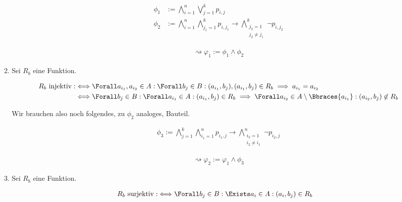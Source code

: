 \begin{solution}
\begin{enumerate}[label = \arabic*.]
  \begin{align*}
    \phi_1
    & :=
    \bigwedge_{i=1}^n \bigvee_{j=1}^kp_{i,j} \\
    \phi_2
    & :=
    \bigwedge_{i=1}^n \bigwedge_{j_1=1}^kp_{i,j_1}
    \to
    \bigwedge_{\substack{j_2=1 \\ j_2\neq j_1}}^{k}\neg p_{i,j_2}
  \end{align*}

  \begin{align*}
    \rightsquigarrow
    \varphi_1 := \phi_1 \land \phi_2
  \end{align*}

  \item Sei $R_b$ eine Funktion.

  \begin{align*}
    R_b ~\text{injektiv}
    :\iff
    & \Forall a_{i_1}, a_{i_2} \in A:
    \Forall b_j \in B:
    (a_{i_1}, b_j), (a_{i_1}, b_j) \in R_b
    \implies
    a_{i_1} = a_{i_2} \\
    \iff
    & \Forall b_j \in B:
    \Forall a_{i_1} \in A:
    (a_{i_1}, b_j) \in R_b
    \implies
    \Forall a_{i_2} \in A \setminus \Bbraces{a_{i_1}}:
    (a_{i_2}, b_j) \not \in R_b
  \end{align*}

  Wir brauchen also noch folgendes, zu $\phi_2$ analoges, Bauteil.

  \begin{align*}
    \phi_3
    :=
    \bigwedge_{j=1}^k \bigwedge_{i_1=1}^np_{i_1,j}
    \to
    \bigwedge_{\substack{i_2=1 \\ i_2\neq i_1}}^{n}\neg p_{i_2,j}
  \end{align*}

  \begin{align*}
    \rightsquigarrow
    \varphi_2
    :=
    \varphi_1 \land \phi_3
  \end{align*}


  \item Sei $R_b$ eine Funktion.

  \begin{align*}
    R_b ~\text{surjektiv}
    :\iff
    & \Forall b_j \in B:
    \Exists a_i \in A:
    (a_i, b_j) \in R_b
  \end{align*}


\end{enumerate}
\end{solution}

